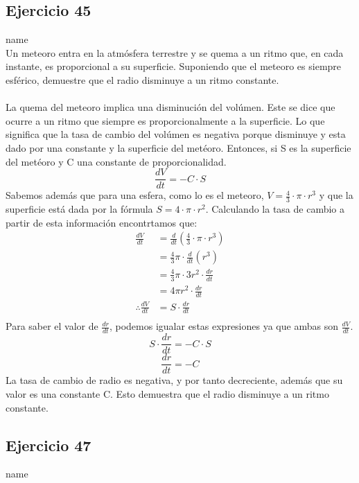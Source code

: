 \documentclass[12pt]{article}
\begin{document}
\subsection{Ejercicio 45} name \\

Un meteoro entra en la atmósfera terrestre y se quema a un ritmo que, en cada instante, es proporcional a su superficie. Suponiendo que el meteoro es siempre esférico, demuestre que el radio disminuye a un ritmo constante.\\ \\
La quema del meteoro implica una disminución del volúmen. Este se dice que ocurre a un ritmo que siempre es proporcionalmente a la superficie. Lo que significa que la tasa de cambio del volúmen es negativa porque disminuye y esta dado por una constante y la superficie del metéoro. Entonces, si S es la superficie del metéoro y C una constante de proporcionalidad.
\[
\frac{dV}{dt} = -C \cdot S
\]
Sabemos además que para una esfera, como lo es el meteoro, $V= \frac{4}{3}\cdot \pi \cdot r^{3}$ y que la superficie está dada por la fórmula $S=4 \cdot \pi \cdot r^{2}$.
Calculando la tasa de cambio a partir de esta información encontrtamos que:
\begin{equation*}
  \begin{split}
  \frac{dV}{dt} 
  &= \frac{d}{dt} (\frac{4}{3}\cdot \pi \cdot r^{3})\\
  &= \frac{4}{3} \pi \cdot  \frac{d}{dt} (r^{3})\\
  &= \frac{4}{3} \pi \cdot  3r^{2} \cdot \frac{dr}{dt}\\
  &= 4  \pi r^{2} \cdot \frac{dr}{dt}\\
  \therefore
   \frac{dV}{dt}
     &= S  \cdot \frac{dr}{dt} \\
  \end{split}
\end{equation*}
Para saber el valor de $\frac{dr}{dt}$, podemos igualar estas expresiones ya que ambas son $  \frac{dV}{dt}$.
\[
 S  \cdot \frac{dr}{dt} =  -C \cdot S  
 \]
 \[
  \frac{dr}{dt} =  -C  
  \]
La tasa de cambio de radio es negativa, y por tanto decreciente, además que su valor es una constante C. Esto demuestra que el radio disminuye a un ritmo constante. 

\subsection{Ejercicio 47} name \\
\end{document}
